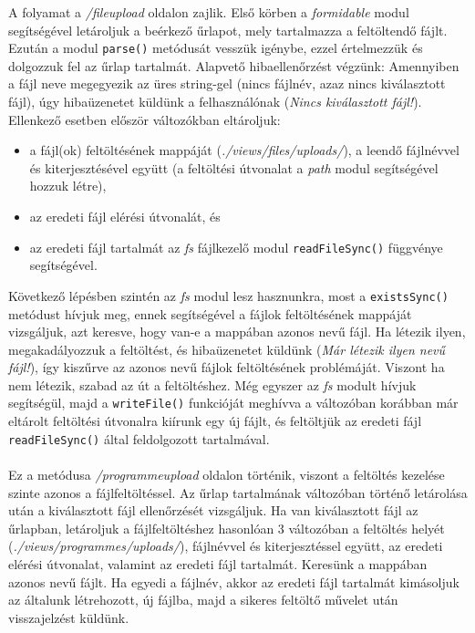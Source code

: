 A folyamat a \textit{/fileupload} oldalon zajlik. Első körben a \textit{formidable} modul segítségével letároljuk a beérkező űrlapot, mely tartalmazza a feltöltendő fájlt. Ezután a modul \texttt{parse()} metódusát vesszük igénybe, ezzel értelmezzük és dolgozzuk fel az űrlap tartalmát. Alapvető hibaellenőrzést végzünk: Amennyiben a fájl neve megegyezik az üres string-gel (nincs fájlnév, azaz nincs kiválasztott fájl), úgy hibaüzenetet küldünk a felhasználónak (\textit{Nincs kiválasztott fájl!}). Ellenkező esetben először változókban eltároljuk:
\begin{itemize}
\item{a fájl(ok) feltöltésének mappáját (\textit{./views/files/uploads/}), a leendő fájlnévvel és kiterjesztésével együtt (a feltöltési útvonalat a \textit{path} modul segítségével hozzuk létre),}
\item{az eredeti fájl elérési útvonalát, és}
\item{az eredeti fájl tartalmát az \textit{fs} fájlkezelő modul \texttt{readFileSync()} függvénye segítségével.}
\end{itemize}
Következő lépésben szintén az \textit{fs} modul lesz hasznunkra, most a \texttt{existsSync()} metódust hívjuk meg, ennek segítségével a fájlok feltöltésének mappáját vizsgáljuk, azt keresve, hogy van-e a mappában azonos nevű fájl. Ha létezik ilyen, megakadályozzuk a feltöltést, és hibaüzenetet küldünk (\textit{Már létezik ilyen nevű fájl!}), így kiszűrve az azonos nevű fájlok feltöltésének problémáját. Viszont ha nem létezik, szabad az út a feltöltéshez. Még egyszer az \textit{fs} modult hívjuk segítségül, majd a \texttt{writeFile()} funkcióját meghívva a változóban korábban már eltárolt feltöltési útvonalra kiírunk egy új fájlt, és feltöltjük az eredeti fájl \texttt{readFileSync()} által feldolgozott tartalmával.\\

\\

Ez a metódusa \textit{/programmeupload} oldalon történik, viszont a feltöltés kezelése szinte azonos a fájlfeltöltéssel. Az űrlap tartalmának változóban történő letárolása után a kiválasztott fájl ellenőrzését vizsgáljuk. Ha van kiválasztott fájl az űrlapban, letároljuk a fájlfeltöltéshez hasonlóan 3 változóban a feltöltés helyét (\textit{./views/programmes/uploads/}), fájlnévvel és kiterjesztéssel együtt, az eredeti elérési útvonalat, valamint az eredeti fájl tartalmát. Keresünk a mappában azonos nevű fájlt. Ha egyedi a fájlnév, akkor az eredeti fájl tartalmát kimásoljuk az általunk létrehozott, új fájlba, majd a sikeres feltöltő művelet után visszajelzést küldünk.

